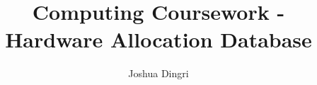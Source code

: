 \documentclass{report}
\begin{document}
\title{Computing Coursework - Hardware Allocation Database}
\author{Joshua Dingri}
\maketitle
\tableofcontents
%
%
%

%
%
\end{document}
